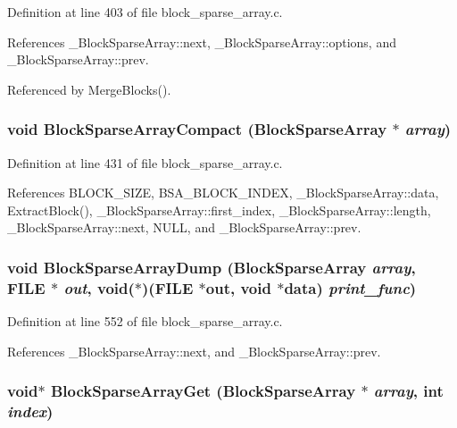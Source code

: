 Definition at line 403 of file block\_\-sparse\_\-array.c.

References \_\-Block\-Sparse\-Array::next, \_\-Block\-Sparse\-Array::options, and \_\-Block\-Sparse\-Array::prev.

Referenced by Merge\-Blocks().
\subsubsection{\setlength{\rightskip}{0pt plus 5cm}void Block\-Sparse\-Array\-Compact (\bf{Block\-Sparse\-Array} $\ast$ {\em array})}\label{block__sparse__array_8c_ca4448964f6ae7164e8e6b7e3fdebdc8}




Definition at line 431 of file block\_\-sparse\_\-array.c.

References BLOCK\_\-SIZE, BSA\_\-BLOCK\_\-INDEX, \_\-Block\-Sparse\-Array::data, Extract\-Block(), \_\-Block\-Sparse\-Array::first\_\-index, \_\-Block\-Sparse\-Array::length, \_\-Block\-Sparse\-Array::next, NULL, and \_\-Block\-Sparse\-Array::prev.
\subsubsection{\setlength{\rightskip}{0pt plus 5cm}void Block\-Sparse\-Array\-Dump (\bf{Block\-Sparse\-Array} {\em array}, FILE $\ast$ {\em out}, void($\ast$)(FILE $\ast$out, void $\ast$data) {\em print\_\-func})}\label{block__sparse__array_8c_235c49b2a1c0bba47b344568ed490866}




Definition at line 552 of file block\_\-sparse\_\-array.c.

References \_\-Block\-Sparse\-Array::next, and \_\-Block\-Sparse\-Array::prev.
\subsubsection{\setlength{\rightskip}{0pt plus 5cm}void$\ast$ Block\-Sparse\-Array\-Get (\bf{Block\-Sparse\-Array} $\ast$ {\em array}, int {\em index})}\label{block__sparse__array_8c_1c50d98a3304ccd73b83a89417606ca5}




